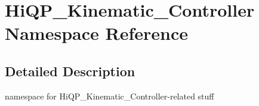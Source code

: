 \hypertarget{namespaceHiQP__Kinematic__Controller}{\section{Hi\-Q\-P\-\_\-\-Kinematic\-\_\-\-Controller Namespace Reference}
\label{namespaceHiQP__Kinematic__Controller}
}


\subsection{Detailed Description}
namespace for Hi\-Q\-P\-\_\-\-Kinematic\-\_\-\-Controller-\/related stuff 
